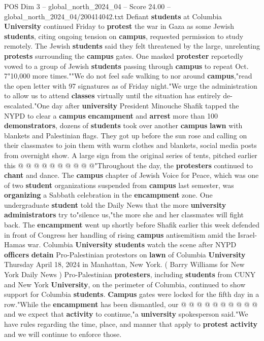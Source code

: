 \begin{textsample}{POS Dim 3 – global\_north\_2024\_04 – Score 24.00 – global\_north\_2024\_04/200414042.txt}  \label{ex:f3_pos_052}
Defiant \textbf{students} at Columbia \textbf{University} continued Friday to \textbf{protest} the war in Gaza as some Jewish \textbf{students}, citing ongoing tension on \textbf{campus}, requested permission to study remotely.
The Jewish \textbf{students} said they felt threatened by the large, unrelenting \textbf{protests} surrounding the \textbf{campus} gates.
One masked \textbf{protester} reportedly vowed to a group of Jewish \textbf{students} passing through \textbf{campus} to repeat Oct. 7"10,000 more times.""We do not feel safe walking to nor around \textbf{campus},"read the open letter with 97 signatures as of Friday night."We urge the administration to allow us to attend \textbf{classes} virtually until the situation has entirely de-escalated."One day after \textbf{university} President Minouche Shafik tapped the NYPD to clear a \textbf{campus} \textbf{encampment} and \textbf{arrest} more than 100 \textbf{demonstrators}, dozens of \textbf{students} took over another \textbf{campus} \textbf{lawn} with blankets and Palestinian flags.
They got up before the sun rose and calling on their classmates to join them with warm clothes and blankets, social media posts from overnight show.
A large sign from the original series of tents, pitched earlier this @ @ @ @ @ @ @ @ @ @"Throughout the day, the \textbf{protesters} continued to \textbf{chant} and dance.
The \textbf{campus} chapter of Jewish Voice for Peace, which was one of two \textbf{student} organizations suspended from \textbf{campus} last semester, was \textbf{organizing} a Sabbath celebration in the \textbf{encampment} zone.
One undergraduate \textbf{student} told the Daily News that the more \textbf{university} \textbf{administrators} try to"silence us,"the more she and her classmates will fight back.
The \textbf{encampment} went up shortly before Shafik earlier this week defended in front of Congress her handling of rising \textbf{campus} antisemitism amid the Israel-Hamas war.
Columbia \textbf{University} \textbf{students} watch the scene after NYPD \textbf{officers} \textbf{detain} Pro-Palestinian protestors on \textbf{lawn} of Columbia \textbf{University} Thursday April 18, 2024 in Manhattan, New York. ( Barry Williams for New York Daily News ) Pro-Palestinian \textbf{protesters}, including \textbf{students} from CUNY and New York \textbf{University}, on the perimeter of Columbia, continued to show support for Columbia \textbf{students}. \textbf{Campus} gates were locked for the fifth day in a row."While the \textbf{encampment} has been dismantled, our @ @ @ @ @ @ @ @ @ @ and we expect that \textbf{activity} to continue,"a \textbf{university} spokesperson said."We have rules regarding the time, place, and manner that apply to \textbf{protest} \textbf{activity} and we will continue to enforce those.

\end{textsample}
